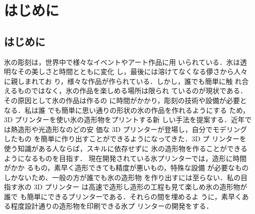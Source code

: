 \chapter{はじめに}
\label{chp:first}

\section{はじめに}
\label{sec:paragraph}

氷の彫刻は，世界中で様々なイベントやアート作品に用
いられている．氷は透明なその美しさと時間とともに変化
し，最後には溶けてなくなる儚さから人々に親しまれてお
り，様々な作品が作られている．しかし，誰でも簡単に触
れ合えるものではなく，氷の作品を楽しめる場所は限られ
ているのが現状である．その原因として氷の作品は作るの
に時間がかかり，彫刻の技術や設備が必要となる．私は誰
でも簡単に思い通りの形状の氷の作品を作れるようにする
ため，3D プリンターを使い氷の造形物をプリントする新
しい手法を提案する．近年では熱造形や光造形なのどの安
価な 3D プリンターが登場し，自分でモデリングしたもの
を簡単に作り出すことができるようになってきた．3D プ
リンターを使う知識がある人ならば，スキルに依存せずに
氷の造形物を作ることができるようになるものを目指す．
現在開発されている氷プリンターでは，造形に時間がかか
るもの，素早く造形できても精度が悪いもの，特殊な設備
が必要なものしかないため、一般の方が誰でも氷の造形物
を作り出すには至らない．私の目指す氷の 3D プリンター
は高速で造形し造形の工程も見て楽しめ氷の造形物が誰で
も簡単にできるプリンターである．それらの間を埋めるよ
うに，素早くある程度設計通りの造形物を印刷できる氷プ
リンターの開発をする．
